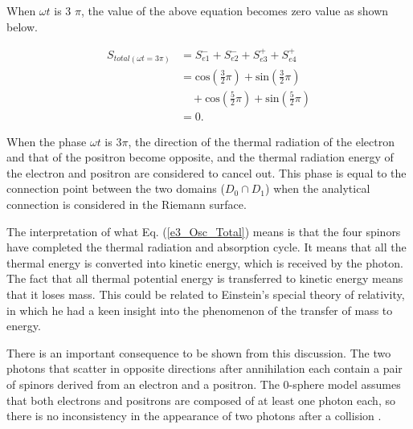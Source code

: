 \documentclass[%
 reprint,
 amsmath,amssymb,
 aps,
]{revtex4-1}
\numberwithin{equation}{section}%
\begin{document}
When $\omega t$ is 3 $\pi$, the value of the above equation becomes zero value as shown below.

        \begin{equation}
            \begin{split}
                S_{total(\omega t = 3\pi)} 
                &= S_{e1}^{-} + S_{e2}^{-} + S_{e3}^{+} + S_{e4}^{+} \\
                &= \mathrm{cos} \left( \frac{3}{2} \pi \right) +  \mathrm{sin} \left( \frac{3}{2} \pi \right) \\
                &\quad + \mathrm{cos} \left( \frac{5}{2} \pi \right) + \mathrm{sin} \left( \frac{5}{2} \pi \right) \\
                &= 0
                .
                \label{e3_Osc_Total}
            \end{split}
        \end{equation}


When the phase $\omega t$ is $3\pi$, the direction of the thermal radiation of the electron and that of the positron become opposite, and the thermal radiation energy of the electron and positron are considered to cancel out. This phase is equal to the connection point between the two domains ($D_{0} \cap D_{1}$) when the analytical connection is considered in the Riemann surface.


The interpretation of what Eq. (\ref{e3_Osc_Total}) means is that the four spinors have completed the thermal radiation and absorption cycle. It means that all the thermal energy is converted into kinetic energy, which is received by the photon. The fact that all thermal potential energy is transferred to kinetic energy means that it loses mass. This could be related to Einstein's special theory of relativity, in which he had a keen insight into the phenomenon of the transfer of mass to energy.



There is an important consequence to be shown from this discussion. The two photons that scatter in opposite directions after annihilation each contain a pair of spinors derived from an electron and a positron. The 0-sphere model assumes that both electrons and positrons are composed of at least one photon each, so there is no inconsistency in the appearance of two photons after a collision \cite{Hanamura1}.
\end{document}
